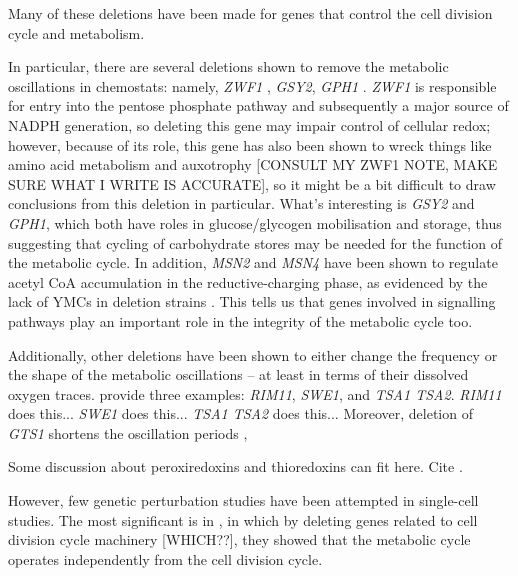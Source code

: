 Many of these deletions have been made for genes that control the cell division cycle and metabolism.

In particular, there are several deletions shown to remove the metabolic oscillations in chemostats: namely, \emph{ZWF1} \citep{tuCyclicChangesMetabolic2007}, \emph{GSY2}, \emph{GPH1} \parencite{oneillCircadianRhythmsPersist2011}.
\emph{ZWF1} is responsible for entry into the pentose phosphate pathway and subsequently a major source of NADPH generation, so deleting this gene may impair control of cellular redox;
however, because of its role, this gene has also been shown to wreck things like amino acid metabolism and auxotrophy [CONSULT MY ZWF1 NOTE, MAKE SURE WHAT I WRITE IS ACCURATE], so it might be a bit difficult to draw conclusions from this deletion in particular.
What's interesting is \emph{GSY2} and \emph{GPH1}, which both have roles in glucose/glycogen mobilisation and storage, thus suggesting that cycling of carbohydrate stores may be needed for the function of the metabolic cycle. %
In addition, \emph{MSN2} and \emph{MSN4} have been shown to regulate acetyl CoA accumulation in the reductive-charging phase, as evidenced by the lack of YMCs in deletion strains \citep{kuangMsn2RegulateExpression2017}.
This tells us that genes involved in signalling pathways play an important role in the integrity of the metabolic cycle too.

Additionally, other deletions have been shown to either change the frequency or the shape of the metabolic oscillations -- at least in terms of their dissolved oxygen traces.
\textcite{caustonMetabolicCyclesYeast2015} provide three examples: \emph{RIM11}, \emph{SWE1}, and \emph{TSA1 TSA2}. %
\emph{RIM11} does this...
\emph{SWE1} does this...
\emph{TSA1 TSA2} does this...
Moreover, deletion of \emph{GTS1} shortens the oscillation periods \citep{lloydUltradianMetronomeTimekeeper2005},

Some discussion about peroxiredoxins and thioredoxins can fit here.
Cite \textcite{amponsahPeroxiredoxinsCoupleMetabolism2021}.

However, few genetic perturbation studies have been attempted in single-cell studies.
The most significant is in \textcite{baumgartnerFlavinbasedMetabolicCycles2018}, in which by deleting genes related to cell division cycle machinery [WHICH??], they showed that the metabolic cycle operates independently from the cell division cycle.

